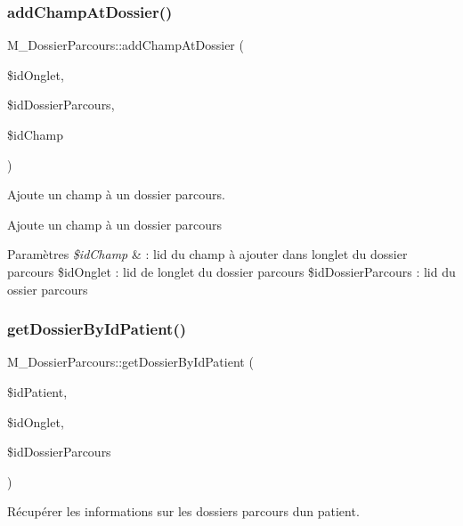 \subsubsection{\texorpdfstring{add\+Champ\+At\+Dossier()}{addChampAtDossier()}}
{\footnotesize\ttfamily M\+\_\+\+Dossier\+Parcours\+::add\+Champ\+At\+Dossier (\begin{DoxyParamCaption}\item[{}]{\$id\+Onglet,  }\item[{}]{\$id\+Dossier\+Parcours,  }\item[{}]{\$id\+Champ }\end{DoxyParamCaption})}



Ajoute un champ à un dossier parcours. 

Ajoute un champ à un dossier parcours 
\begin{DoxyParams}{Paramètres}
{\em \$id\+Champ} & \+: l\textquotesingle{}id du champ à ajouter dans l\textquotesingle{}onglet du dossier parcours \$id\+Onglet \+: l\textquotesingle{}id de l\textquotesingle{}onglet du dossier parcours \$id\+Dossier\+Parcours \+: l\textquotesingle{}id du ossier parcours \\
\hline
\end{DoxyParams}
\mbox{\label{class_m___dossier_parcours_aaf2f5a9cf7ab3c7f528db1e71ca2def6}} 
\subsubsection{\texorpdfstring{get\+Dossier\+By\+Id\+Patient()}{getDossierByIdPatient()}}
{\footnotesize\ttfamily M\+\_\+\+Dossier\+Parcours\+::get\+Dossier\+By\+Id\+Patient (\begin{DoxyParamCaption}\item[{}]{\$id\+Patient,  }\item[{}]{\$id\+Onglet,  }\item[{}]{\$id\+Dossier\+Parcours }\end{DoxyParamCaption})}



Récupérer les informations sur les dossiers parcours d\textquotesingle{}un patient. 

